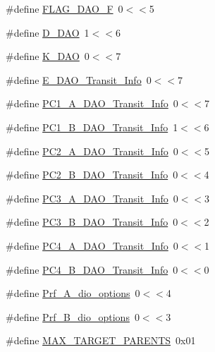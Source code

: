 \begin{DoxyCompactItemize}
\item 
\#define \hyperlink{group___i_c_m_pv6_r_p_l_ga80b1a8bb01b3aa941d3c5c1b24056f1b}{F\+L\+A\+G\+\_\+\+D\+A\+O\+\_\+F}~0$<$$<$5
\item 
\#define \hyperlink{group___i_c_m_pv6_r_p_l_ga6068b74c52b57686cdd3af054379ab31}{D\+\_\+\+D\+AO}~1$<$$<$6
\item 
\#define \hyperlink{group___i_c_m_pv6_r_p_l_gae04d97823b9a09639485cd885dfc6854}{K\+\_\+\+D\+AO}~0$<$$<$7
\item 
\#define \hyperlink{group___i_c_m_pv6_r_p_l_ga695843fab4443b9208b9b3f63668e4b3}{E\+\_\+\+D\+A\+O\+\_\+\+Transit\+\_\+\+Info}~0$<$$<$7
\item 
\#define \hyperlink{group___i_c_m_pv6_r_p_l_ga278d0adaa18c164bf954fcbe111b937b}{P\+C1\+\_\+\+A\+\_\+\+D\+A\+O\+\_\+\+Transit\+\_\+\+Info}~0$<$$<$7
\item 
\#define \hyperlink{group___i_c_m_pv6_r_p_l_ga60733cb2ce82a72353db3118127783f5}{P\+C1\+\_\+\+B\+\_\+\+D\+A\+O\+\_\+\+Transit\+\_\+\+Info}~1$<$$<$6
\item 
\#define \hyperlink{group___i_c_m_pv6_r_p_l_ga45ff21ca0a0df20b71f49005fbe49414}{P\+C2\+\_\+\+A\+\_\+\+D\+A\+O\+\_\+\+Transit\+\_\+\+Info}~0$<$$<$5
\item 
\#define \hyperlink{group___i_c_m_pv6_r_p_l_ga4e4f4816b56e79b12c5779bbe4c8c55d}{P\+C2\+\_\+\+B\+\_\+\+D\+A\+O\+\_\+\+Transit\+\_\+\+Info}~0$<$$<$4
\item 
\#define \hyperlink{group___i_c_m_pv6_r_p_l_gaeea581acd364f8ba4c521ed008202d0a}{P\+C3\+\_\+\+A\+\_\+\+D\+A\+O\+\_\+\+Transit\+\_\+\+Info}~0$<$$<$3
\item 
\#define \hyperlink{group___i_c_m_pv6_r_p_l_gab525a1e4393362a8495f09c8a7a13d55}{P\+C3\+\_\+\+B\+\_\+\+D\+A\+O\+\_\+\+Transit\+\_\+\+Info}~0$<$$<$2
\item 
\#define \hyperlink{group___i_c_m_pv6_r_p_l_ga271f09d6156330c6e804cd58eaff9835}{P\+C4\+\_\+\+A\+\_\+\+D\+A\+O\+\_\+\+Transit\+\_\+\+Info}~0$<$$<$1
\item 
\#define \hyperlink{group___i_c_m_pv6_r_p_l_ga554e0487c145ca7a58180fc68a8124b5}{P\+C4\+\_\+\+B\+\_\+\+D\+A\+O\+\_\+\+Transit\+\_\+\+Info}~0$<$$<$0
\item 
\#define \hyperlink{group___i_c_m_pv6_r_p_l_ga9d6ec6543b7bff16d8d84df14fdee91f}{Prf\+\_\+\+A\+\_\+dio\+\_\+options}~0$<$$<$4
\item 
\#define \hyperlink{group___i_c_m_pv6_r_p_l_gaaeaa18d2b800967f481707f376852a50}{Prf\+\_\+\+B\+\_\+dio\+\_\+options}~0$<$$<$3
\item 
\#define \hyperlink{group___i_c_m_pv6_r_p_l_ga2f6d170fd016021a724a8730292e6c37}{M\+A\+X\+\_\+\+T\+A\+R\+G\+E\+T\+\_\+\+P\+A\+R\+E\+N\+TS}~0x01
\end{DoxyCompactItemize}
